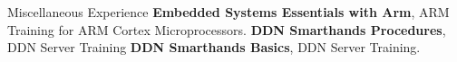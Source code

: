 \begin{rubric}{Miscellaneous Experience}
\entry*[2024] \textbf{Embedded Systems Essentials with Arm}, ARM Training for ARM Cortex Microprocessors.
\entry*[2024] \textbf{DDN Smarthands Procedures}, DDN Server Training
\entry*[2024] \textbf{DDN Smarthands Basics}, DDN Server Training.


\end{rubric}
